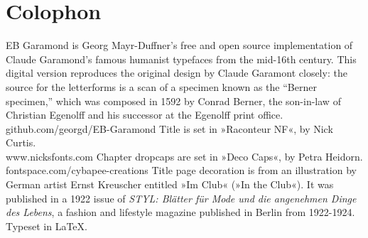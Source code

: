 \documentclass[
paper=5.5in:8.5in,
BCOR=7mm,
twoside,
DIV=calc,
11pt,
usegeometry,
chapterprefix,
headings=big]{scrbook} %
\begin{document}
\pagestyle{plain}

\renewcommand*\raggedchapter{\centering}





\tableofcontents
\enlargethispage{1.5\baselineskip}
\clearpage








\mainmatter
\pagestyle{headings}
\renewcommand*{\chapterpagestyle}{plain}


























\clearpage
{}
\chapter*{Colophon}
\begin{center}
EB Garamond is Georg Mayr-Duffner's free and open source implementation of Claude Garamond’s famous humanist typefaces from the mid-16th century. This digital version reproduces the original design by Claude Garamont closely: the source for the letterforms is a scan of a specimen known as the \enquote{Berner specimen,} which was composed in 1592 by Conrad Berner, the son-in-law of Christian Egenolff and his successor at the Egenolff print office.  \\github.com/georgd/EB-Garamond
\vfill
Title is set in »Raconteur NF«, by Nick Curtis.\\www.nicksfonts.com
\vfill
Chapter dropcaps are set in »Deco Caps«, by Petra Heidorn.\\fontspace.com/cybapee-creations
\vfill
Title page decoration is from an illustration by German artist Ernst Kreuscher entitled »Im Club« (»In the Club«). It was published in a 1922 issue of \textit{STYL: Blätter für Mode und die angenehmen Dinge des Lebens}, a fashion and lifestyle magazine published in Berlin from 1922-1924.
\vfill
Typeset in \LaTeX{}.
\end{center}
\thispagestyle{empty}
\end{document}

